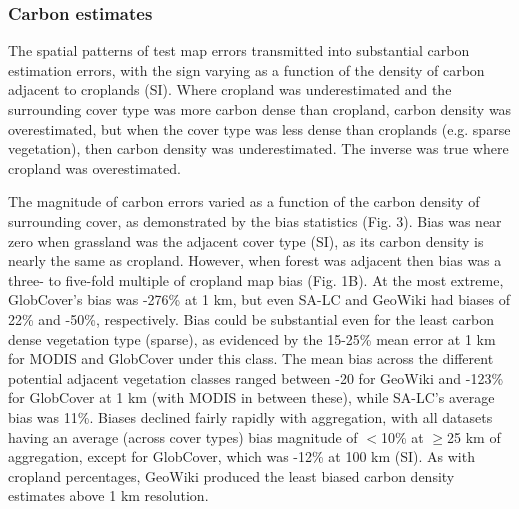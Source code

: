 \documentclass[a4paper]{article}
\begin{document}
\subsubsection*{Carbon estimates}
\vspace{-0.2 cm}
The spatial patterns of test map errors transmitted into substantial carbon estimation errors, with the sign varying as a function of the density of carbon adjacent to croplands (SI). Where cropland was underestimated and the surrounding cover type was more carbon dense than cropland, carbon density was overestimated, but when the cover type was less dense than croplands (e.g. sparse vegetation), then carbon density was underestimated. The inverse was true where cropland was overestimated. 

The magnitude of carbon errors varied as a function of the carbon density of surrounding cover, as demonstrated by the bias statistics (Fig. 3). Bias was near zero when grassland was the adjacent cover type (SI), as its carbon density is nearly the same as cropland. However, when forest was adjacent then bias was a three- to five-fold multiple of cropland map bias (Fig. 1B). At the most extreme, GlobCover's bias was -276\% at 1 km, but even SA-LC and GeoWiki had biases of 22\% and -50\%, respectively. Bias could be substantial even for the least carbon dense vegetation type (sparse), as evidenced by the 15-25\% mean error at 1 km for MODIS and GlobCover under this class.  The mean bias across the different potential adjacent vegetation classes ranged between -20 for GeoWiki and -123\% for GlobCover at 1 km (with MODIS in between these), while SA-LC's average bias was 11\%.  Biases declined fairly rapidly with aggregation, with all datasets having an average (across cover types) bias magnitude of $<$10\% at $\geq$25 km of aggregation, except for GlobCover, which was -12\% at 100 km (SI).  As with cropland percentages, GeoWiki produced the least biased carbon density estimates above 1 km resolution. 
\end{document}
